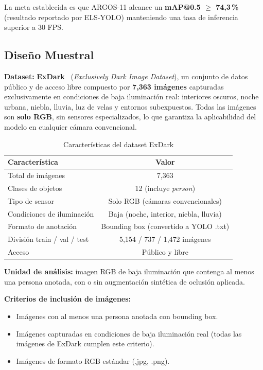 La meta establecida es que ARGOS-11 alcance un
\textbf{mAP@0.5 $\geq$ 74{,}3\,\%} (resultado reportado por
ELS-YOLO) manteniendo una tasa de inferencia superior a 30 FPS.

\subsection{Dise\~{n}o Muestral}

\textbf{Dataset:} \textbf{ExDark}~\cite{Loh2019} (\textit{Exclusively
Dark Image Dataset}), un conjunto de datos p\'ublico y de acceso
libre compuesto por \textbf{7{,}363 im\'agenes} capturadas
exclusivamente en condiciones de baja iluminaci\'on real: interiores
oscuros, noche urbana, niebla, lluvia, luz de velas y entornos
subexpuestos. Todas las im\'agenes son \textbf{solo RGB}, sin
sensores especializados, lo que garantiza la aplicabilidad del
modelo en cualquier c\'amara convencional.

\begin{table}[h!]
\centering
\caption{Caracter\'{i}sticas del dataset ExDark}
\label{tab:exdark}
\renewcommand{\arraystretch}{1.3}
\begin{tabular}{|l|c|}
\hline
\textbf{Caracter\'{i}stica} & \textbf{Valor} \\
\hline
Total de im\'agenes & 7{,}363 \\
\hline
Clases de objetos & 12 (incluye \textit{person}) \\
\hline
Tipo de sensor & Solo RGB (c\'amaras convencionales) \\
\hline
Condiciones de iluminaci\'on & Baja (noche, interior, niebla, lluvia) \\
\hline
Formato de anotaci\'on & Bounding box (convertido a YOLO .txt) \\
\hline
Divisi\'on train / val / test & 5{,}154 / 737 / 1{,}472 im\'agenes \\
\hline
Acceso & P\'ublico y libre \\
\hline
\end{tabular}
\end{table}

\noindent\textbf{Unidad de an\'alisis:} imagen RGB de baja
iluminaci\'on que contenga al menos una persona anotada, con o sin
augmentaci\'on sint\'etica de oclusi\'on aplicada.

\bigskip
\textbf{Criterios de inclusi\'on de im\'agenes:}
\begin{itemize}
  \item Im\'agenes con al menos una persona anotada con bounding
        box.
  \item Im\'agenes capturadas en condiciones de baja iluminaci\'on
        real (todas las im\'agenes de ExDark cumplen este criterio).
  \item Im\'agenes de formato RGB est\'andar (.jpg, .png).
\end{itemize}

